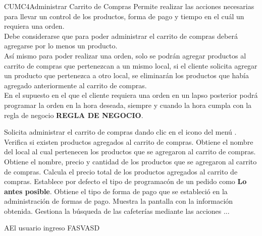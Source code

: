 
\begin{UseCase}{CUMC4}{Administrar Carrito de Compras}{
	Permite realizar las acciones necesarias para llevar un control de los productos, forma de pago y tiempo en el cuál un  requiera una orden. \\
	Debe considerarse que para poder administrar el carrito de compras deberá agregarse por lo menos un producto. \\Así mismo para poder realizar una orden, solo se podrán agregar productos al carrito de compras que pertenezcan a un mismo local, si el cliente solicita agregar un producto que pertenezca a otro local, se eliminarán los productos que había agregado anteriormente al carrito de compras.\\
	
	En el supuesto en el que el cliente requiera una orden en un lapso posterior podrá programar la orden en la hora deseada, siempre y cuando la hora cumpla con la regla de negocio \textbf{REGLA DE NEGOCIO}. }
	\end{UseCase}
	
	
	\begin{UCtrayectoria}
		\UCpaso[\UCactor] Solicita administrar el carrito de compras dando clic en el icono \cartIcon del menú . 
		\UCpaso Verifica si existen productos agregados al carrito de compras. 
		\UCpaso Obtiene el nombre del local al cual pertenecen los productos que se agregaron al carrito de compras.
		\UCpaso Obtiene el nombre, precio y cantidad de los productos que se agregaron al carrito de compras.
		\UCpaso Calcula el precio total de los productos agregados al carrito de compras.
		\UCpaso Establece por defecto el tipo de programacón de un pedido como \textbf{Lo antes posible}.
		\UCpaso Obtiene el tipo de forma de pago que se estableció en la administración de formas de pago.
		\UCpaso Muestra la pantalla  con la información obtenida.		
		\UCpaso[\UCactor] Gestiona la búsqueda de las cafeterías mediante las acciones ...
	
	\end{UCtrayectoria}
	

	\begin{UCtrayectoriaA}{A}{El usuario ingreso}
		\UCpaso FASVASD
	
	\end{UCtrayectoriaA}
	